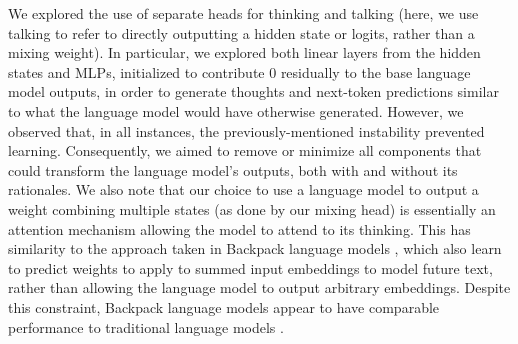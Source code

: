\documentclass{article} %
\begin{document}
We explored the use of separate heads for thinking and talking (here, we use talking to refer to directly outputting a hidden state or logits, rather than a mixing weight). In particular, we explored both linear layers from the hidden states and MLPs, initialized to contribute 0 residually to the base language model outputs, in order to generate thoughts and next-token predictions similar to what the language model would have otherwise generated. However, we observed that, in all instances, the previously-mentioned instability prevented learning. Consequently, we aimed to remove or minimize all components that could transform the language model's outputs, both with and without its rationales. 
We also note that our choice to use a language model to output a weight combining multiple states (as done by our mixing head) is essentially an attention mechanism allowing the model to attend to its thinking.
This has similarity to the approach taken in Backpack language models \citep{hewitt2023backpack}, which also learn to predict weights to apply to summed input embeddings to model future text, rather than allowing the language model to output arbitrary embeddings. Despite this constraint, Backpack language models appear to have comparable performance to traditional language models \citep{hewitt2023backpack}.
\end{document}
